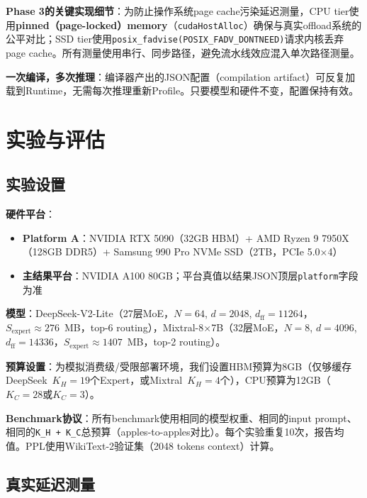 \documentclass[11pt,a4paper]{article}
\begin{document}
\textbf{Phase 3的关键实现细节}：为防止操作系统page cache污染延迟测量，CPU tier使用\textbf{pinned（page-locked）memory}（\texttt{cudaHostAlloc}）确保与真实offload系统的公平对比；SSD tier使用\texttt{posix\_fadvise(POSIX\_FADV\_DONTNEED)}请求内核丢弃page cache。所有测量使用串行、同步路径，避免流水线效应混入单次路径测量。

\textbf{一次编译，多次推理}：编译器产出的JSON配置（compilation artifact）可反复加载到Runtime，无需每次推理重新Profile。只要模型和硬件不变，配置保持有效。

\section{实验与评估}

\subsection{实验设置}

\textbf{硬件平台}：
\begin{itemize}
    \item \textbf{Platform A}：NVIDIA RTX 5090（32GB HBM）+ AMD Ryzen 9 7950X（128GB DDR5）+ Samsung 990 Pro NVMe SSD（2TB，PCIe 5.0×4）
    \item \textbf{主结果平台}：NVIDIA A100 80GB；平台真值以结果JSON顶层\texttt{platform}字段为准
\end{itemize}

\textbf{模型}：DeepSeek-V2-Lite（27层MoE，$N=64$, $d=2048$, $d_{\text{ff}}=11264$，$S_{\text{expert}}\approx 276$~MB，top-6 routing），Mixtral-8×7B（32层MoE，$N=8$, $d=4096$, $d_{\text{ff}}=14336$，$S_{\text{expert}}\approx 1407$~MB，top-2 routing）。

\textbf{预算设置}：为模拟消费级/受限部署环境，我们设置HBM预算为8GB（仅够缓存DeepSeek~$K_H=19$个Expert，或Mixtral~$K_H=4$个），CPU预算为12GB（$K_C=28$或$K_C=3$）。

\textbf{Benchmark协议}：所有benchmark使用相同的模型权重、相同的input prompt、相同的\texttt{K\_H + K\_C}总预算（apples-to-apples对比）。每个实验重复10次，报告均值。PPL使用WikiText-2验证集（2048 tokens context）计算。

\subsection{真实延迟测量}
\end{document}
